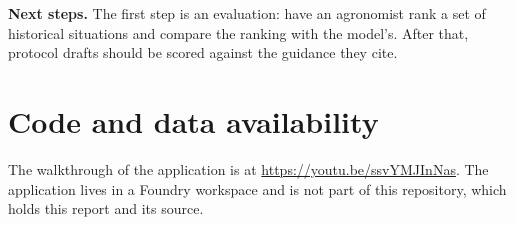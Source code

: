 \documentclass[11pt,letterpaper]{article}
\begin{document}
\textbf{Next steps.} The first step is an evaluation: have an agronomist rank a set of historical situations and compare the ranking with the model's. After that, protocol drafts should be scored against the guidance they cite.

\section*{Code and data availability}
The walkthrough of the application is at \url{https://youtu.be/ssvYMJInNas}. The application lives in a Foundry workspace and is not part of this repository, which holds this report and its source.



\end{document}

